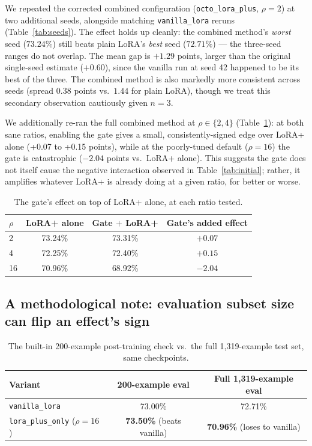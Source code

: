 \documentclass[11pt]{article}
\begin{document}
We repeated the corrected combined configuration
(\texttt{octo\_lora\_plus}, $\rho{=}2$) at two additional seeds, alongside
matching \texttt{vanilla\_lora} reruns (Table~\ref{tab:seeds}). The
effect holds up cleanly: the combined method's \emph{worst} seed
($73.24\%$) still beats plain LoRA's \emph{best} seed ($72.71\%$) — the
three-seed ranges do not overlap. The mean gap is $+1.29$ points, larger
than the original single-seed estimate ($+0.60$), since the vanilla
run at seed 42 happened to be its best of the three. The combined method
is also markedly more consistent across seeds (spread $0.38$ points vs.\
$1.44$ for plain LoRA), though we treat this secondary observation
cautiously given $n=3$.

We additionally re-ran the full combined method at $\rho \in \{2, 4\}$
(Table~\ref{tab:gateeffect}): at both sane ratios, enabling the gate gives
a small, consistently-signed edge over LoRA+ alone (+0.07 to +0.15
points), while at the poorly-tuned default ($\rho{=}16$) the gate is
catastrophic ($-2.04$ points vs.\ LoRA+ alone). This suggests the gate does
not itself cause the negative interaction observed in
Table~\ref{tab:initial}; rather, it amplifies whatever LoRA+ is already
doing at a given ratio, for better or worse.

\begin{table}[t]
\centering
\caption{The gate's effect on top of LoRA+ alone, at each ratio tested.}
\label{tab:gateeffect}
\begin{tabular}{lccc}
\toprule
$\rho$ & LoRA+ alone & Gate $+$ LoRA+ & Gate's added effect \\
\midrule
2  & 73.24\% & 73.31\% & $+0.07$ \\
4  & 72.25\% & 72.40\% & $+0.15$ \\
16 & 70.96\% & 68.92\% & $-2.04$ \\
\bottomrule
\end{tabular}
\end{table}

\subsection{A methodological note: evaluation subset size can flip an effect's sign}

\begin{table}[t]
\centering
\caption{The built-in 200-example post-training check vs.\ the full
1{,}319-example test set, same checkpoints.}
\label{tab:subseteval}
\begin{tabular}{lcc}
\toprule
Variant & 200-example eval & Full 1{,}319-example eval \\
\midrule
\texttt{vanilla\_lora}    & 73.00\% & 72.71\% \\
\texttt{lora\_plus\_only} ($\rho{=}16$) & \textbf{73.50\%} (beats vanilla) & \textbf{70.96\%} (loses to vanilla) \\
\bottomrule
\end{tabular}
\end{table}
\end{document}
